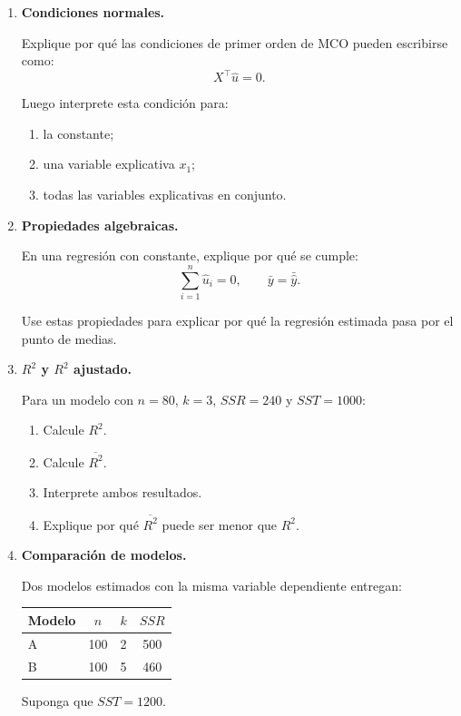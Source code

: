 \documentclass[11pt]{article}
\begin{document}
\begin{enumerate}[label=\textbf{Ejercicio \arabic*.}, leftmargin=*]
\item \textbf{Condiciones normales.}

Explique por qué las condiciones de primer orden de MCO pueden escribirse como:
\[
X^\top \hat{u}=0.
\]

Luego interprete esta condición para:
\begin{enumerate}[label=\alph*)]
    \item la constante;
    \item una variable explicativa \(x_1\);
    \item todas las variables explicativas en conjunto.
\end{enumerate}

\item \textbf{Propiedades algebraicas.}

En una regresión con constante, explique por qué se cumple:
\[
\sum_{i=1}^{n}\hat{u}_i=0,
\qquad
\bar{y}=\bar{\hat{y}}.
\]

Use estas propiedades para explicar por qué la regresión estimada pasa por el punto de medias.

\item \textbf{\(R^2\) y \(R^2\) ajustado.}

Para un modelo con \(n=80\), \(k=3\), \(SSR=240\) y \(SST=1000\):

\begin{enumerate}[label=\alph*)]
    \item Calcule \(R^2\).
    \item Calcule \(\overline{R^2}\).
    \item Interprete ambos resultados.
    \item Explique por qué \(\overline{R^2}\) puede ser menor que \(R^2\).
\end{enumerate}

\item \textbf{Comparación de modelos.}

Dos modelos estimados con la misma variable dependiente entregan:

\begin{center}
\begin{tabular}{lccc}
\toprule
Modelo & \(n\) & \(k\) & \(SSR\) \\
\midrule
A & 100 & 2 & 500 \\
B & 100 & 5 & 460 \\
\bottomrule
\end{tabular}
\end{center}

Suponga que \(SST=1200\).


\end{enumerate}
\end{document}
